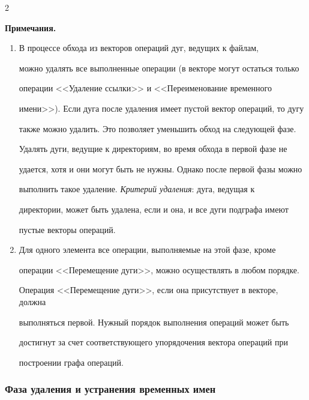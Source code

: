 \begin{multicols}{2}
\smallskip


\noindent


\textbf{Примечания.}





\noindent


{\sf 


\begin{enumerate}[1.] 


\item В процессе обхода из векторов операций дуг, ведущих к файлам, 


можно удалять все выполненные операции (в векторе могут остаться только 


операции <<Удаление ссылки>> и <<Переименование временного 


имени>>). Если дуга после удаления имеет пустой вектор операций, то дугу 


также можно удалить. Это позволяет уменьшить обход на следующей фазе. 


Удалять дуги, ведущие к директориям, во время обхода в первой фазе не 


удается, хотя и они могут быть не нужны. Однако после первой фазы можно 


выполнить такое удаление. \textit{Критерий удаления}: дуга, ведущая к 


директории, может быть удалена, если и она, и все дуги подграфа имеют 


пустые векторы операций.


\item Для одного элемента все операции, вы\-пол\-ня\-емые на этой фазе, кроме 


операции <<Перемещение дуги>>,  можно осуществлять в любом порядке. 


Операция <<Перемещение дуги>>, если она присутствует в векторе, должна 


выполняться первой. Нужный порядок выполнения операций может быть 


достигнут за счет соответствующего упорядочения вектора операций при 


построении графа операций.


\end{enumerate}}





\subsubsection{Фаза удаления и устранения временных имен} %



\end{multicols}
